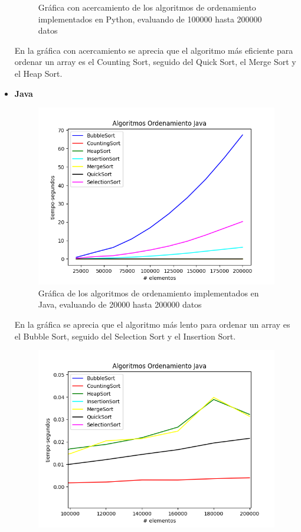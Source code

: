 \begin{itemize}
\begin{figure}[H]
	        \caption{Gráfica con acercamiento de los algoritmos de ordenamiento implementados en Python, evaluando de 100000 hasta 200000 datos}
		\end{figure}
En la gráfica con acercamiento se aprecia que el algoritmo más eficiente para ordenar un array es el Counting Sort, seguido del Quick Sort, el Merge Sort y el Heap Sort.
    \item \textbf{Java}
        \begin{figure}[H]
	        \centering
	        \includegraphics[scale=0.5]{Practica01/images/plots/Sorts_Java.png}
	        \caption{Gráfica de los algoritmos de ordenamiento implementados en Java, evaluando de 20000 hasta 200000 datos}
		\end{figure}
En la gráfica se aprecia que el algoritmo más lento para ordenar un array es el Bubble Sort, seguido del Selection Sort y el Insertion Sort.
        \begin{figure}[H]
	        \centering
	        \includegraphics[scale=0.5]{Practica01/images/plots/Sorts2_Java.png}

\end{figure}
\end{itemize}
